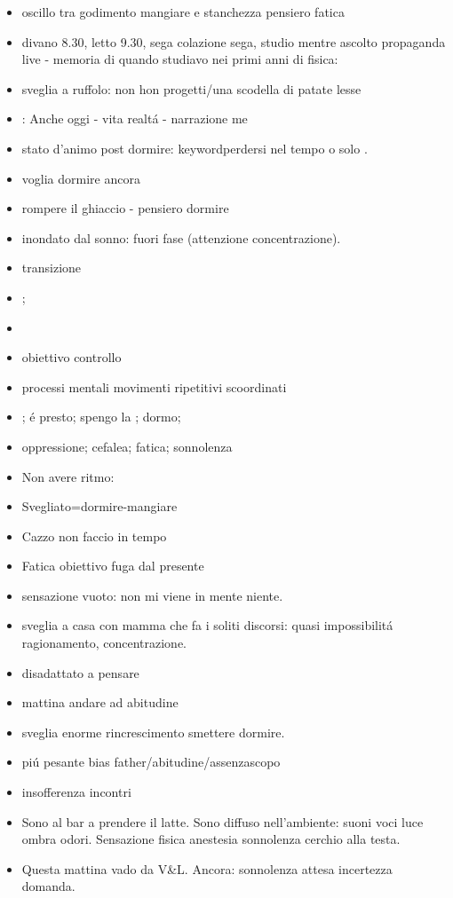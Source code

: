 \begin{itemize}
\item oscillo tra godimento mangiare e stanchezza pensiero fatica
\item divano 8.30, letto 9.30, sega colazione sega, studio mentre ascolto propaganda live - memoria di quando studiavo nei primi anni di fisica: 
\item sveglia a ruffolo: non hon progetti/una scodella di patate lesse
\item {}: Anche oggi - vita realt\'a - narrazione me
\item stato d'animo post dormire:   keyword{perdersi nel tempo} o solo  .
\item voglia dormire ancora
\item rompere il ghiaccio - pensiero dormire
\item inondato dal sonno: fuori fase (attenzione concentrazione).
\item transizione
\item {} ;
\item {} 
\item obiettivo controllo
\item processi mentali movimenti ripetitivi scoordinati
\item {}; \'e presto; spengo la ; dormo;
\item oppressione; cefalea; fatica; sonnolenza
\item Non avere ritmo:
\item Svegliato=dormire-mangiare
\item Cazzo non faccio in tempo
\item Fatica obiettivo fuga dal presente
\item sensazione vuoto: non mi viene in mente niente.
\item sveglia a casa con mamma che fa i soliti discorsi: quasi impossibilit\'a ragionamento, concentrazione.
\item disadattato a pensare
\item mattina andare ad abitudine
\item sveglia enorme rincrescimento smettere dormire.
\item pi\'u pesante bias father/abitudine/assenzascopo
\item insofferenza incontri
\item Sono al bar a prendere il latte. Sono diffuso nell'ambiente: suoni voci luce ombra odori. Sensazione fisica anestesia sonnolenza cerchio alla testa.
\item Questa mattina vado da V\&L. Ancora: sonnolenza attesa incertezza domanda.
\end{itemize}

